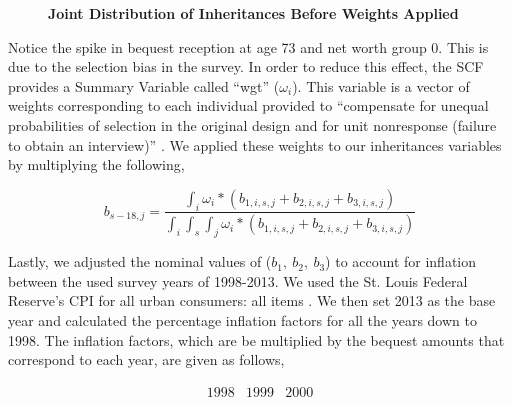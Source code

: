 \documentclass[letterpaper,12pt]{article}
\newcommand{\quotes}[1]{``#1''}
\theoremstyle{definition}
\begin{document}
\begin{spacing}{1.5}
  \begin{figure}[htbp]\centering \captionsetup{width=5.5in}
      \caption{\label{Weightfig}\textbf{Joint Distribution of Inheritances Before Weights Applied}}
    \end{figure}
  \newpage

  Notice the spike in bequest reception at age 73 and net worth group 0. This is due to the selection bias in the survey. In order to reduce this effect, the SCF provides a Summary Variable called \quotes{wgt} ($\omega_i$). This variable is a vector of weights corresponding to each individual provided to \quotes{compensate for unequal probabilities of selection in the original design and for unit nonresponse (failure to obtain an interview)} \citet{FEDweight}. We applied these weights to our inheritances variables by multiplying the following,

  \[b_{s-18,j} = \frac{\int_i \omega_i *(b_{1,i,s,j} + b_{2,i,s,j} +b_{3,i,s,j})}{\int_i \int_s \int_j \omega_i *(b_{1,i,s,j} + b_{2,i,s,j} +b_{3,i,s,j})}\]




  Lastly, we adjusted the nominal values of ($b_1, ~ b_2,~b_3$) to account for inflation between the used survey years of 1998-2013. We used the St. Louis Federal Reserve's CPI for all urban consumers: all items \citet{StFed} . We then set 2013 as the base year and calculated the percentage inflation factors for all the years down to 1998. The inflation factors, which are be multiplied by the bequest amounts that correspond to each year, are given as follows,

  \[
  \begin{matrix}
  \hline
  

    1998&  1999&  2000\\


\end{matrix}\]
\end{spacing}
\end{document}
